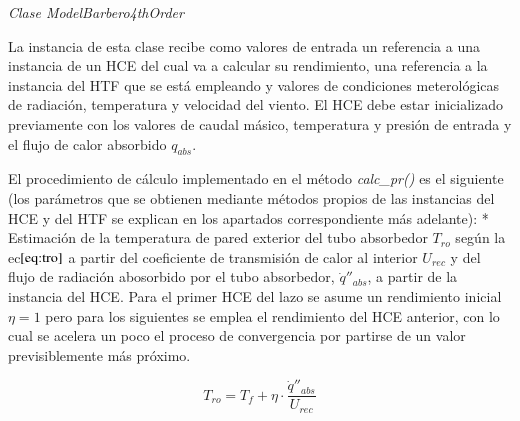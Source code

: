 \emph{Clase ModelBarbero4thOrder}

La instancia de esta clase recibe como valores de entrada un referencia a una instancia de un HCE del cual va a calcular su rendimiento, una referencia a la instancia del HTF que se está empleando y valores de condiciones meterológicas de radiación, temperatura y velocidad del viento. El HCE debe estar inicializado previamente con los valores de caudal másico, temperatura y presión de entrada y el flujo de calor absorbido \(q_{abs}\).

El procedimiento de cálculo implementado en el método \emph{calc\_pr()} es el siguiente (los parámetros que se obtienen mediante métodos propios de las instancias del HCE y del HTF se explican en los apartados correspondiente más adelante): * Estimación de la temperatura de pared exterior del tubo absorbedor \(T_{ro}\) según la ec\(\eqref{eq:tro}\) a partir del coeficiente de transmisión de calor al interior \(U_{rec}\) y del flujo de radiación abosorbido por el tubo absorbedor, \(\dot q''_{abs}\), a partir de la instancia del HCE. Para el primer HCE del lazo se asume un rendimiento inicial \(\eta=1\) pero para los siguientes se emplea el rendimiento del HCE anterior, con lo cual se acelera un poco el proceso de convergencia por partirse de un valor previsiblemente más próximo.

\begin{equation}
    T_{ro} = T_f + \eta \cdot \frac{\dot q''_{abs}}{U_{rec}}
    \label{eq:tro}
\end{equation}

